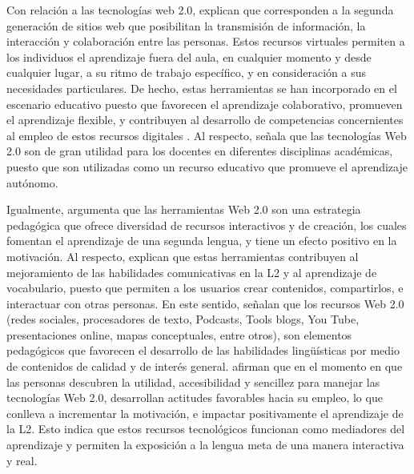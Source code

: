 \documentclass[spanish]{textolivre}
\begin{document}
Con relación a las tecnologías web 2.0, \textcite{moussaoui_integration_2020} explican que corresponden a la segunda generación de sitios web que posibilitan la transmisión de información, la interacción y colaboración entre las personas. Estos recursos virtuales permiten a los individuos el aprendizaje fuera del aula, en cualquier momento y desde cualquier lugar, a su ritmo de trabajo específico, y en consideración a sus necesidades particulares. De hecho, estas herramientas se han incorporado en el escenario educativo puesto que favorecen el aprendizaje colaborativo, promueven el aprendizaje flexible, y contribuyen al desarrollo de competencias concernientes al empleo de estos recursos digitales \cite{hassan_challenges_2021}. Al respecto, \textcite{asiksoy_elt_2018} señala que las tecnologías Web 2.0 son de gran utilidad para los docentes en diferentes disciplinas académicas, puesto que son utilizadas como un recurso educativo que promueve el aprendizaje autónomo. 

Igualmente, \textcite{asiksoy_elt_2018} argumenta que las herramientas Web 2.0 son una estrategia pedagógica que ofrece diversidad de recursos interactivos y de creación, los cuales fomentan el aprendizaje de una segunda lengua, y tiene un efecto positivo en la motivación. Al respecto, \textcite{mohammed_use_2020} explican que estas herramientas contribuyen al mejoramiento de las habilidades comunicativas en la L2 y al aprendizaje de vocabulario, puesto que permiten a los usuarios crear contenidos, compartirlos, e interactuar con otras personas. En este sentido, \textcite{moussaoui_integration_2020} señalan que los recursos Web 2.0 (redes sociales, procesadores de texto, Podcasts, Tools blogs, You Tube, presentaciones online, mapas conceptuales, entre otros), son elementos pedagógicos que favorecen el desarrollo de las habilidades lingüísticas por medio de contenidos de calidad y de interés general. \textcite{jarrah_arab_2021} afirman que en el momento en que las personas descubren la utilidad, accesibilidad y sencillez para manejar las tecnologías Web 2.0, desarrollan actitudes favorables hacia su empleo, lo que conlleva a incrementar la motivación, e impactar positivamente el aprendizaje de la L2. Esto indica que estos recursos tecnológicos funcionan como mediadores del aprendizaje y permiten la exposición a la lengua meta de una manera interactiva y real.  
\end{document}
